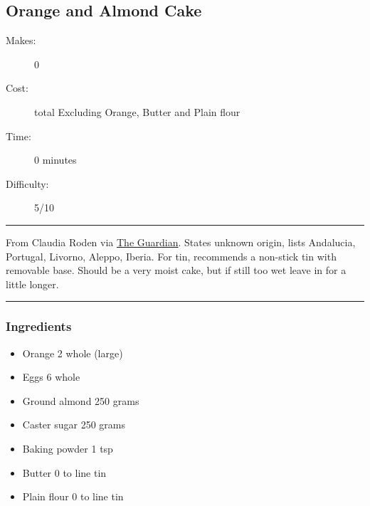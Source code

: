 \documentclass[]{article}
\begin{document}
\subsection*{\center\huge Orange and Almond Cake}
\begin{description}
\item[Makes:] 0 
\item[Cost:]  total Excluding Orange, Butter and Plain flour
\item[Time:] 0 minutes
\item[Difficulty:] 5/10
\end{description}
\vspace{0.2cm}\hrule\vspace{0.5cm}
\begin{adjustwidth}{0.5 cm}{0.5 cm}

From Claudia Roden via \href{https://www.theguardian.com/food/2022/sep/26/claudia-roden-recipe-for-orange-and-almond-cake}{The Guardian}. States unknown origin, lists Andalucia, Portugal, Livorno, Aleppo, Iberia. For tin, recommends a non-stick tin with removable base. Should be a very moist cake, but if still too wet leave in for a little longer. \hfill{}\color{black}

\end{adjustwidth}
\vspace{0.5cm}\hrule
\subsubsection*{\Large Ingredients}
\begin{multicols}{2}
\begin{itemize}
 \item Orange \hfill 2 whole (large)
 \item Eggs \hfill 6 whole
 \item Ground almond \hfill 250 grams
 \item Caster sugar \hfill 250 grams
 \item Baking powder \hfill 1 tsp
 \item Butter \hfill 0 to line tin
 \item Plain flour \hfill 0 to line tin
\end{itemize}
\end{multicols}
\end{document}
